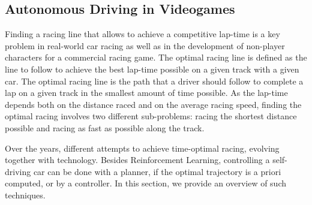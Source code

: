 \subsection{Autonomous Driving in Videogames}
Finding a racing line that allows to achieve a competitive lap-time is a key problem in real-world car racing as well as in the development of non-player characters for a commercial racing game.
The optimal racing line is defined as the line to follow to achieve the best lap-time possible on a given track with a given car. The optimal racing line is the path that a driver should follow to complete a lap on a given track in the smallest amount of time possible. As the lap-time depends both on the distance raced and on the average racing speed, finding the optimal racing involves two different sub-problems: racing the shortest distance possible and racing as fast as possible along the track.

Over the years, different attempts to achieve time-optimal racing, evolving together with technology. Besides Reinforcement Learning, controlling a self-driving car can be done with a planner, if the optimal trajectory is a priori computed, or by a controller. In this section, we provide an overview of such techniques. 


